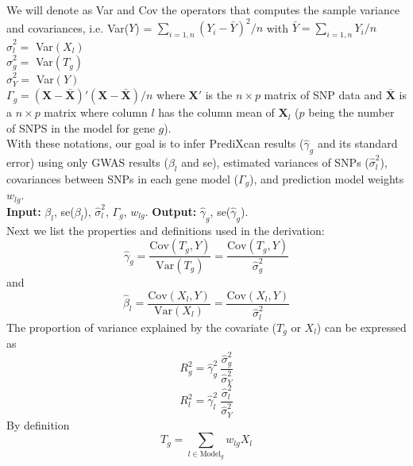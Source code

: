 \documentclass[10pt]{article}
\begin{document}
We will denote as Var and Cov the operators that computes the sample variance and covariances, i.e. Var($Y$) = $\sum_{i=1,n} (Y_i - \bar{Y})^2/n$ with $\bar{Y} = \sum_{i=1,n} Y_i / n$\\
$\hat\sigma^2_l = $  Var$(X_l)$\\
$\hat\sigma^2_g = $  Var$(T_g)$\\
$\hat\sigma^2_Y = $  Var$(Y)$\\
$\Gamma_g = \mathbf{(X-\bar{X})'(X-\bar{X})}/n$ where  $\mathbf{X'}$ is the $n \times p$ matrix of SNP data and $\mathbf{\bar{X}}$ is a $n \times p$ matrix where column $l$ has the column mean of $\mathbf{X}_l$ ($p$ being the number of SNPS in the  model for gene $g$).\\
%
%
With these notations, our goal is to infer PrediXcan results ($\hat\gamma_g$ and its standard error) using only GWAS results ($\beta_l$ and se), estimated variances of SNPs 
($\hat\sigma^2_l$), covariances between SNPs in each gene model ($\Gamma_g$), and prediction model weights $w_{lg}$.\\

\textbf{Input:}  $\beta_l$, se($\beta_l$), $\hat\sigma^2_l$, $\Gamma_g$, $w_{lg}$.
\textbf{Output:} 
$\hat\gamma_g$, se($\hat\gamma_g$).\\

Next we list the properties and definitions used in the derivation: 
\begin{equation}
\hat\gamma_g = \frac{ \text{Cov}(T_g,Y) }{ \text{Var}(T_g)}  =  \frac{ \text{Cov}(T_g,Y) }{ \hat\sigma^2_g }
\end{equation}
and  
\begin{equation}
\hat \beta_l = \frac{ \text{Cov}(X_l,Y) }{ \text{Var}(X_l) } =  \frac{ \text{Cov}(X_l,Y) }{ \hat\sigma_l^2 } \label{eq.beta}
\end{equation}
The proportion of variance explained by the covariate ($T_g$ or $X_l$) can be expressed as\\
\begin{equation}
R_g^2 = \hat\gamma^2_g ~ \frac{\hat\sigma_g^2 }{ \hat\sigma^2_Y} \nonumber
\end{equation}
\begin{equation}
R_l^2 = \hat\gamma^2_l ~ \frac{\hat\sigma_l^2 }{ \hat\sigma^2_Y} \nonumber
\end{equation}
By definition
\begin{equation}
T_g = \sum_{l \in \text{Model}_g} w_{lg}X_l 
\end{equation}
\end{document}

